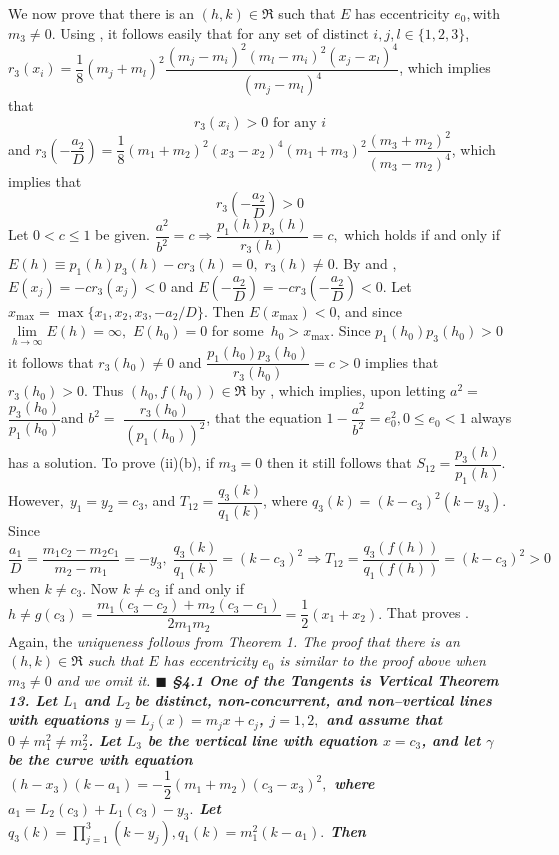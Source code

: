 	We now prove that there is an $(h,k)\in \Re $ such that $E$ has eccentricity $e_{0},$with $m_{3}\neq 0.$ Using , it follows easily that for any set of distinct $i,j,l\in \{1,2,3\}$, $r_{3}(x_{i})=\allowbreak \dfrac{1}{8}(m_{j}+m_{l})^{2}\dfrac{(m_{j}-m_{i})^{2}(m_{l}-m_{i})^{2}(x_{j}-x_{l})^{4}}{(m_{j}-m_{l})^{4}}$, which implies that $$r_{3}(x_{i})>0\text{ for any }i\tag{53}$$ and $r_{3}\left( -\dfrac{a_{2}}{D}\right) =\dfrac{1}{8}\left( m_{1}+m_{2}\right) ^{2}(x_{3}-x_{2})^{4}\left( m_{1}+m_{3}\right) ^{2}\dfrac{\left( m_{3}+m_{2}\right) ^{2}}{\left( m_{3}-m_{2}\right) ^{4}}$, which implies that $$r_{3}\left( -\dfrac{a_{2}}{D}\right) >0\tag{54}$$ Let $0<c\leq 1$ be given. $\dfrac{a^{2}}{b^{2}}=c\Rightarrow \dfrac{p_{1}(h)p_{3}(h)}{r_{3}(h)}=c,$ which holds if and only if $E(h)\equiv p_{1}(h)p_{3}(h)-cr_{3}(h)=0,$ $r_{3}(h)\neq 0.$ By  and , $E(x_{j})=-cr_{3}(x_{j})<0$ and $E\left( -\dfrac{a_{2}}{D}\right) =-cr_{3}\left( -\dfrac{a_{2}}{D}\right) <0$. Let $x_{\max }=\max \{x_{1},x_{2},x_{3},-a_{2}/D\}$. Then $E(x_{\max })<0$, and since $\lim\limits_{h\rightarrow \infty }E(h)=\infty ,$ $E(h_{0})=0$ for some\ $h_{0}>x_{\max }.$ Since $p_{1}(h_{0})p_{3}(h_{0})>0$ it follows that $r_{3}(h_{0})\neq 0$ and $\dfrac{p_{1}(h_{0})p_{3}(h_{0})}{r_{3}(h_{0})}=c>0$ implies that $r_{3}(h_{0})>0$. Thus $(h_{0},f(h_{0}))\in \Re $ by 
, which implies, upon letting $a^{2}=$ $\dfrac{p_{3}(h_{0})}{p_{1}(h_{0})}$and $b^{2}=$ $\dfrac{r_{3}(h_{0})}{(p_{1}(h_{0}))^{2}}$, that the equation $1-\dfrac{a^{2}}{b^{2}}=e_{0}^{2},0\leq e_{0}<1$ always has a solution. To prove (ii)(b), if $m_{3}=0$ then it still follows that $S_{12}=\dfrac{p_{3}(h)}{p_{1}(h)}.$ However$,\;y_{1}=y_{2}=c_{3}$, and $T_{12}=\dfrac{q_{3}(k)}{q_{1}(k)}$, where $q_{3}(k)=(k-c_{3})^{2}(k-y_{3}).$ Since $\dfrac{a_{1}}{D}=\allowbreak \dfrac{m_{1}c_{2}-m_{2}c_{1}}{m_{2}-m_{1}}=-y_{3},\;\dfrac{q_{3}(k)}{q_{1}(k)}=(k-c_{3})^{2}\Rightarrow T_{12}=\dfrac{q_{3}(f(h))}{q_{1}(f(h))}=(k-c_{3})^{2}>0$ when $k\neq c_{3}$. Now $k\neq c_{3}$ if and only if $h\neq g(c_{3})=\dfrac{m_{1}(c_{3}-c_{2})+m_{2}(c_{3}-c_{1})}{2m_{1}m_{2}}=\dfrac{1}{2}(x_{1}+x_{2}).$ That proves . Again, the \it uniqueness \rm follows from Theorem 1. The proof that there is an $(h,k)\in \Re $ such that $E$ has eccentricity $e_{0}$ is similar to the proof above when $m_{3}\neq 0$ and we omit it. $\blacksquare$ \nl \nl
\bf \S 4.1 One of the Tangents is Vertical \rm 
\nl \nl \bf Theorem 13. \rm Let $L_{1}$ and $L_{2}\;$be distinct, non-concurrent, and non--vertical lines with equations $y=L_{j}(x)=m_{j}x+c_{j}$, $j=1,2,$ and assume that $0\neq m_{1}^{2}\neq m_{2}^{2}$. Let $L_{3}$ be the vertical line with equation $x=c_{3}$, and let $\gamma $ be the curve with equation $(h-x_{3})(k-a_{1})=-\dfrac{1}{2}\left( m_{1}+m_{2}\right) (c_{3}-x_{3})^{2},$ where $a_{1}=L_{2}(c_{3})+L_{1}(c_{3})-y_{3}.$ Let $q_{3}(k)=\prod\limits_{j=1}^{3}(k-y_{j}),q_{1}(k)=m_{1}^{2}(k-a_{1}).$ Then \nl
